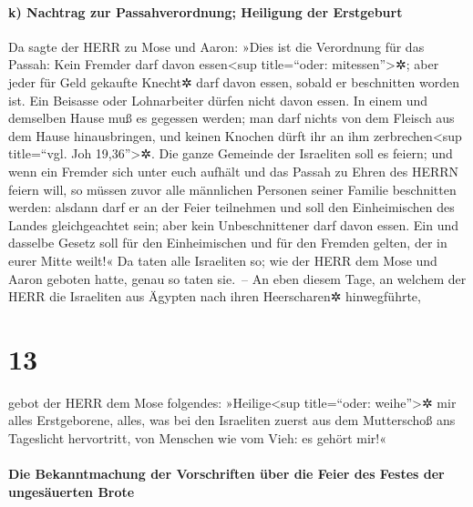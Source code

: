 \hypertarget{k-nachtrag-zur-passahverordnung-heiligung-der-erstgeburt}{%
\paragraph{k) Nachtrag zur Passahverordnung; Heiligung der
Erstgeburt}\label{k-nachtrag-zur-passahverordnung-heiligung-der-erstgeburt}}

 Da sagte der HERR zu Mose und Aaron: »Dies ist die
Verordnung für das Passah: Kein Fremder darf davon essen\textless sup
title=``oder: mitessen''\textgreater✲;  aber jeder für
Geld gekaufte Knecht✲ darf davon essen, sobald er beschnitten worden
ist.  Ein Beisasse oder Lohnarbeiter dürfen nicht davon
essen.  In einem und demselben Hause muß es gegessen
werden; man darf nichts von dem Fleisch aus dem Hause hinausbringen, und
keinen Knochen dürft ihr an ihm zerbrechen\textless sup title=``vgl. Joh
19,36''\textgreater✲.  Die ganze Gemeinde der Israeliten
soll es feiern;  und wenn ein Fremder sich unter euch
aufhält und das Passah zu Ehren des HERRN feiern will, so müssen zuvor
alle männlichen Personen seiner Familie beschnitten werden: alsdann darf
er an der Feier teilnehmen und soll den Einheimischen des Landes
gleichgeachtet sein; aber kein Unbeschnittener darf davon essen.
 Ein und dasselbe Gesetz soll für den Einheimischen und
für den Fremden gelten, der in eurer Mitte weilt!«  Da
taten alle Israeliten so; wie der HERR dem Mose und Aaron geboten hatte,
genau so taten sie.~--  An eben diesem Tage, an welchem
der HERR die Israeliten aus Ägypten nach ihren Heerscharen✲
hinwegführte,

\hypertarget{section-12}{%
\section{13}\label{section-12}}

 gebot der HERR dem Mose folgendes: 
»Heilige\textless sup title=``oder: weihe''\textgreater✲ mir alles
Erstgeborene, alles, was bei den Israeliten zuerst aus dem Mutterschoß
ans Tageslicht hervortritt, von Menschen wie vom Vieh: es gehört mir!«

\hypertarget{die-bekanntmachung-der-vorschriften-uxfcber-die-feier-des-festes-der-ungesuxe4uerten-brote}{%
\paragraph{Die Bekanntmachung der Vorschriften über die Feier des Festes
der ungesäuerten
Brote}\label{die-bekanntmachung-der-vorschriften-uxfcber-die-feier-des-festes-der-ungesuxe4uerten-brote}}

